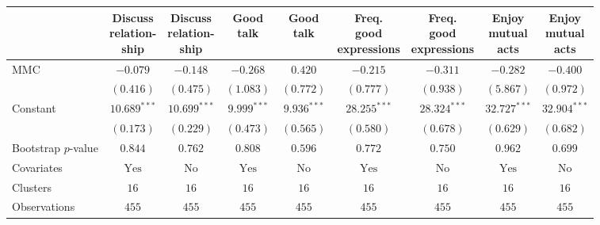 
\begin{tabular}{l c c c c c c c c}
\toprule
 & \shortstack{Discuss \\ relation- \\ ship} & \shortstack{Discuss \\ relation- \\ ship} & \shortstack{Good \\ talk} & \shortstack{Good \\ talk} & \shortstack{Freq. \\ good \\ expressions} & \shortstack{Freq. \\ good \\ expressions} & \shortstack{Enjoy \\ mutual \\ acts} & \shortstack{Enjoy \\ mutual \\ acts} \\
\midrule
MMC                 & $-0.079$       & $-0.148$       & $-0.268$       & $0.420$       & $-0.215$       & $-0.311$       & $-0.282$       & $-0.400$       \\
                    & $(0.416)$      & $(0.475)$      & $(1.083)$      & $(0.772)$     & $(0.777)$      & $(0.938)$      & $(5.867)$      & $(0.972)$      \\
Constant            & $10.689^{***}$ & $10.699^{***}$ & $9.999^{***}$  & $9.936^{***}$ & $28.255^{***}$ & $28.324^{***}$ & $32.727^{***}$ & $32.904^{***}$ \\
                    & $(0.173)$      & $(0.229)$      & $(0.473)$      & $(0.565)$     & $(0.580)$      & $(0.678)$      & $(0.629)$      & $(0.682)$      \\
\midrule
Bootstrap $p$-value & $0.844$        & $0.762$        & $0.808$        & $0.596$       & $0.772$        & $0.750$        & $0.962$        & $0.699$        \\
Covariates          & $\textrm{Yes}$ & $\textrm{No}$  & $\textrm{Yes}$ & $\textrm{No}$ & $\textrm{Yes}$ & $\textrm{No}$  & $\textrm{Yes}$ & $\textrm{No}$  \\
Clusters            & $16$           & $16$           & $16$           & $16$          & $16$           & $16$           & $16$           & $16$           \\
Observations        & $455$          & $455$          & $455$          & $455$         & $455$          & $455$          & $455$          & $455$          \\

\end{tabular}
